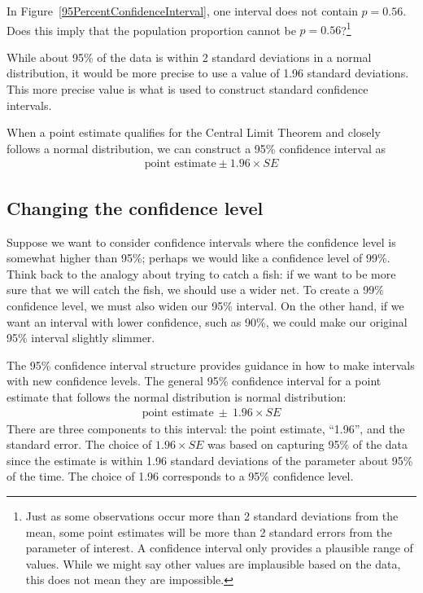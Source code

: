 \begin{exercise}
In Figure~\ref{95PercentConfidenceInterval}, one interval
does not contain $p = 0.56$. Does this imply that the
population proportion cannot be $p = 0.56$?\footnote{Just
as some observations occur more than 2 standard deviations
from the mean, some point estimates will be more than
2 standard errors from the parameter of interest.
A confidence interval only provides a plausible range
of values. While we might say other values are implausible
based on the data, this does not mean they are impossible.}
\end{exercise}

While about 95\% of the data is within 2 standard deviations
in a normal distribution, it would be more precise to use
a value of 1.96 standard deviations. This more precise value
is what is used to construct standard confidence intervals.

\begin{termBox}{
  When a point estimate qualifies for the Central Limit
  Theorem and closely follows a normal distribution,
  we can construct a 95\% confidence interval as
  \begin{align*}
  \text{point estimate} \pm 1.96 \times SE
  \end{align*}}
\end{termBox}


\subsection{Changing the confidence level}
\label{changingTheConfidenceLevelSection}


Suppose we want to consider confidence intervals where the confidence
level is somewhat higher than 95\%; perhaps we would like a confidence
level of 99\%. Think back to the analogy about trying to catch a fish:
if we want to be more sure that we will catch the fish, we should use
a wider net. To create a 99\% confidence level, we must also widen our
95\% interval. On the other hand, if we want an interval with lower
confidence, such as 90\%, we could make our original 95\% interval
slightly slimmer.

The 95\% confidence interval structure provides guidance in how to
make intervals with new confidence levels. The general 95\% confidence
interval for a point estimate that follows the normal distribution is
normal distribution:
\begin{eqnarray}
\text{point estimate}\ \pm\ 1.96\times SE
\end{eqnarray}
There are three components to this interval: the point estimate,
``1.96'', and the standard error. The choice of $1.96\times SE$ was
based on capturing 95\% of the data since the estimate is within 1.96
standard deviations of the parameter about 95\% of the time.
The choice of 1.96 corresponds to a 95\% confidence level. 

